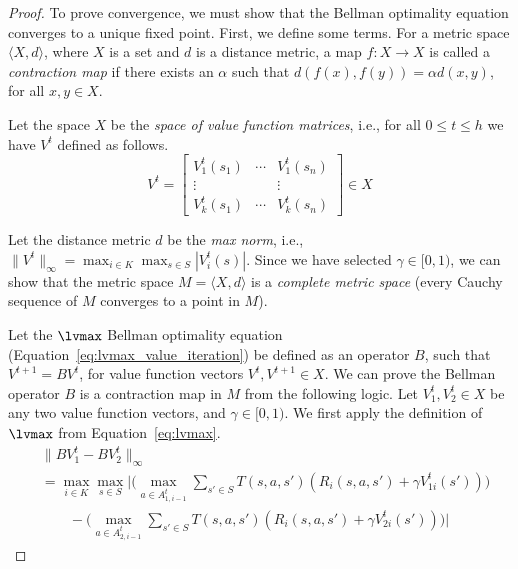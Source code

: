 \begin{proof}
To prove convergence, we must show that the Bellman optimality equation converges to a unique fixed point. First, we define some terms. For a metric space $\langle X, d \rangle$, where $X$ is a set and $d$ is a distance metric, a map $f : X \rightarrow X$ is called a \emph{contraction map} if there exists an $\alpha$ such that $d(f(x), f(y)) = \alpha d(x, y)$, for all $x, y \in X$.

Let the space $X$ be the \emph{space of value function matrices}, i.e., for all $0 \leq t \leq h$ we have $V^t$ defined as follows.
\begin{equation*}
    V^t = \begin{bmatrix}
            V_1^t(s_1) & \cdots & V_1^t(s_n) \\
            \vdots & & \vdots \\
            V_k^t(s_1) & \cdots & V_k^t(s_n)
        \end{bmatrix} \in X
\end{equation*}

Let the distance metric $d$ be the \emph{max norm}, i.e., $\|V^t\|_\infty = \max_{i \in K} \max_{s \in S} |V_i^t(s)|$. Since we have selected $\gamma \in [0, 1)$, we can show that the metric space $M = \langle X, d \rangle$ is a \emph{complete metric space} (every Cauchy sequence of $M$ converges to a point in $M$).

Let the $\lvmax$ Bellman optimality equation (Equation~\ref{eq:lvmax_value_iteration}) be defined as an operator $B$, such that $V^{t+1} = B V^t$, for value function vectors $V^t, V^{t+1} \in X$. We can prove the Bellman operator $B$ is a contraction map in $M$ from the following logic. Let $V_1^t, V_2^t \in X$ be any two value function vectors, and $\gamma \in [0, 1)$. We first apply the definition of $\lvmax$ from Equation~\ref{eq:lvmax}.
\begin{align*}
    &\| B V_1^t - B V_2^t \|_\infty \\
    &= \max_{i \in K} \max_{s \in S} \Big| \Big( \max_{a \in A_{1,i-1}^t} \sum_{s' \in S} T(s, a, s') (R_i(s, a, s') + \gamma V_{1i}^t(s')) \Big) \\
    &\quad \quad - \Big( \max_{a \in A_{2,i-1}^t} \sum_{s' \in S} T(s, a, s') (R_i(s, a, s') + \gamma V_{2i}^t(s')) \Big) \Big|
\end{align*}


\end{proof}
